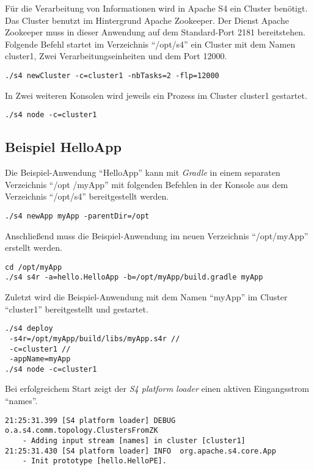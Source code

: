 Für die Verarbeitung von Informationen wird in Apache S4 ein Cluster benötigt. Das Cluster benutzt im Hintergrund Apache Zookeeper. Der Dienst Apache Zookeeper muss in dieser Anwendung auf dem Standard-Port 2181 bereitstehen. Folgende Befehl startet im Verzeichnis "`/opt/s4"' ein Cluster mit dem Namen cluster1, Zwei Verarbeitungseinheiten und dem Port 12000.

\begin{verbatim}
./s4 newCluster -c=cluster1 -nbTasks=2 -flp=12000
\end{verbatim}

In Zwei weiteren Konsolen wird jeweils ein Prozess im Cluster cluster1 gestartet.

\begin{verbatim}
./s4 node -c=cluster1
\end{verbatim}



\subsection{Beispiel HelloApp}

Die Beispiel-Anwendung "`HelloApp"' kann mit \textit{Gradle} in einem separaten Verzeichnis "`/opt /myApp"' mit folgenden Befehlen in der Konsole aus dem Verzeichnis "`/opt/s4"' bereitgestellt werden. 

\begin{verbatim}
./s4 newApp myApp -parentDir=/opt
\end{verbatim}

Anschließend muss die Beispiel-Anwendung im neuen Verzeichnis "`/opt/myApp"' erstellt werden.

\begin{verbatim}
cd /opt/myApp
./s4 s4r -a=hello.HelloApp -b=/opt/myApp/build.gradle myApp
\end{verbatim}

Zuletzt wird die Beispiel-Anwendung mit dem Namen "`myApp"' im Cluster "`cluster1"' bereitgestellt und gestartet.

\begin{verbatim}
./s4 deploy 
 -s4r=/opt/myApp/build/libs/myApp.s4r // 
 -c=cluster1 //
 -appName=myApp
./s4 node -c=cluster1
\end{verbatim}

Bei erfolgreichem Start zeigt der \textit{S4 platform loader} einen aktiven Eingangsstrom "`names"'.

\begin{verbatim}
21:25:31.399 [S4 platform loader] DEBUG o.a.s4.comm.topology.ClustersFromZK 
	- Adding input stream [names] in cluster [cluster1]
21:25:31.430 [S4 platform loader] INFO  org.apache.s4.core.App 
	- Init prototype [hello.HelloPE].
\end{verbatim}


